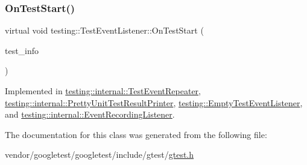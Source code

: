 \mbox{\label{classtesting_1_1_test_event_listener_ab4f6a0ca16ae75daf385b3b5914e1048}} 
\subsubsection{\texorpdfstring{On\+Test\+Start()}{OnTestStart()}}
{\footnotesize\ttfamily virtual void testing\+::\+Test\+Event\+Listener\+::\+On\+Test\+Start (\begin{DoxyParamCaption}\item[{const \hyperlink{classtesting_1_1_test_info}{Test\+Info} \&}]{test\+\_\+info }\end{DoxyParamCaption})\hspace{0.3cm}{\ttfamily [pure virtual]}}



Implemented in \hyperlink{classtesting_1_1internal_1_1_test_event_repeater_a70d694ca5010cc86cd458f7f529e6fbe}{testing\+::internal\+::\+Test\+Event\+Repeater}, \hyperlink{classtesting_1_1internal_1_1_pretty_unit_test_result_printer_a5078ee71cfa97e37ae7a9366149195c5}{testing\+::internal\+::\+Pretty\+Unit\+Test\+Result\+Printer}, \hyperlink{classtesting_1_1_empty_test_event_listener_a84fa74cc9ba742f9f847ea405ca84e5e}{testing\+::\+Empty\+Test\+Event\+Listener}, and \hyperlink{classtesting_1_1internal_1_1_event_recording_listener_aebd488b780fc172d6058ca07ca8f7145}{testing\+::internal\+::\+Event\+Recording\+Listener}.



The documentation for this class was generated from the following file\+:\begin{DoxyCompactItemize}
\item 
vendor/googletest/googletest/include/gtest/\hyperlink{gtest_8h}{gtest.\+h}\end{DoxyCompactItemize}
